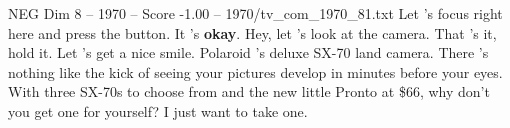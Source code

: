 \begin{textsample}{NEG Dim 8 – 1970 – Score -1.00 – 1970/tv\_com\_1970\_81.txt}  \label{ex:f8_neg_011}
Let 's focus right here and press the button.
It 's \textbf{okay}.
Hey, let 's look at the camera.
That 's it, hold it.
Let 's get a nice smile.
Polaroid 's deluxe SX-70 land camera.
There 's nothing like the kick of seeing your pictures develop in minutes before your eyes.
With three SX-70s to choose from and the new little Pronto at \$66, why don't you get one for yourself?
I just want to take one.

\end{textsample}
